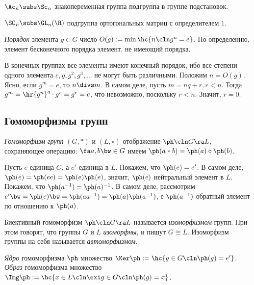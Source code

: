 \documentclass[a4paper]{article}
\newcommand{\kph}{\Ker \ph}
\begin{document}
\begin{ex}

 $\Ac_n \subs \Sc_n$ знакопеременная группа подгруппа в группе подстановок.

 $\SO_n \subs \GL_n(\R)$ подгруппа ортогональных матриц с определителем $1$.
\end{ex}

\begin{df}
\emph{Порядок} элемента $g \in G$ число $O(g) := \min \hc{n\cln g^n=e}$. По определению, элемент бесконечного
порядка элемент, не имеющий порядка.
\end{df}

В конечных группах все элементы имеют конечный порядок, ибо все степени одного элемента
$e, g, g^2, g^3, \dots$ не могут быть различными. Положим $n = O(g)$. Ясно, если $g^m=e$, то
$n \divs m$. В самом деле, пусть $m=nq+r, r < n$. Тогда $g^m=\hr{g^n}^q\cdot g^r=g^r=e$, что невозможно,
поскольку $r < n$. Значит, $r=0$.

\subsection{Гомоморфизмы групп}

\begin{df}
\emph{Гомоморфизм групп} $(G,*)$ и $(L,\circ)$ отображение $\ph\cln G \ra L$, сохраняющее операцию: $\fa
a,b\bw\in G$ имеем $\ph(a*b)=\ph(a)\circ\ph(b)$.
\end{df}

Пусть $e$ единица $G$, а $e'$ единица в $L$. Покажем, что $\ph(e)=e'$. В самом деле,
$\ph(e)=\ph(ee)=\ph(e)\ph(e)$, значит,
$\ph(e)$ нейтральный элемент в $L$. Покажем, что $\ph(a^{-1})= \ph(a)^{-1}$. В самом деле, рассмотрим
$e'\bw=\ph(e)\bw=\ph(aa^{-1})=\ph(a)\ph(a^{-1})$, е $\ph(a^{-1})$ обратный элемент по отношению к $\ph(a)$.

\begin{df}
Биективный гомоморфизм $\ph\cln G \ra L$ называется \emph{изоморфизмом} групп. При этом говорят, что группы
$G$ и $L$ \emph{изоморфны}, и пишут $G \cong L$. Изоморфизм группы на себя называется \emph{автоморфизмом}.
\end{df}

\begin{df}
\emph{Ядро} гомоморфизма $\ph$ множество $\kph := \hc{g \in G\cln \ph(g)=e'}$. \emph{Образ} гомоморфизма
множество $\Img \ph := \hc{x \in L\cln \exi g \in G\cln \ph(g)=x}$.
\end{df}
\end{document}
